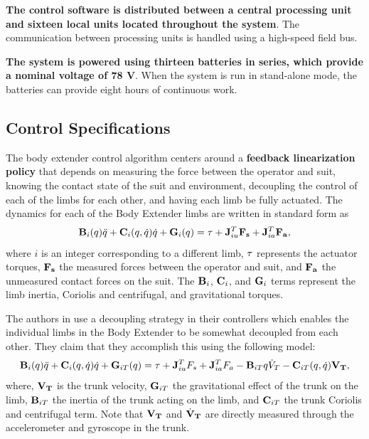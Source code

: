 {\bf The control software is distributed between a central processing unit and sixteen local units located throughout the system}.  The communication between processing units is handled using a high-speed field bus.
 
{\bf The system is powered using thirteen batteries in series, which provide a nominal voltage of 78 V}.  When the system is run in stand-alone mode, the batteries can provide eight hours of continuous work.
 
 
 \subsection{Control Specifications}
 
 The body extender control algorithm centers around a {\bf feedback linearization policy} that depends on measuring the force between the operator and suit, knowing the contact state of the suit and environment, decoupling the control of each of the limbs for each other, and having each limb be fully actuated.  The dynamics for each of the Body Extender limbs are written in standard form as  
\begin{equation}
{\bf B}_i(q) \ddot{q} + {\bf C}_i(q,\dot{q})\dot{q} + {\bf G}_i(q) = {\bf \tau} + {\bf J}^T_{iu}{\bf F_s} + {\bf J}^T_{ia}{\bf F_a},
\end{equation}
where $i$ is an integer corresponding to a different limb, ${\bf \tau}$ represents the actuator torques, ${\bf F_s}$ the measured forces between the operator and suit, and ${\bf F_a}$ the unmeasured contact forces on the suit.  The ${\bf B}_i$, ${\bf C}_i$, and ${\bf G}_i$ terms represent the limb inertia, Coriolis and centrifugal, and gravitational torques.  

The authors in \cite{} use a decoupling strategy in their controllers which enables the individual limbs in the Body Extender to be somewhat decoupled from each other.  They claim that they accomplish this using the following model:
\begin{equation}
{\bf B}_i(q) \ddot{q} + {\bf C}_i(q,\dot{q})\dot{q} + {\bf G}_{iT}(q) = {\bf \tau} + {\bf J}^T_{iu}F_s + {\bf J}^T_{ia}F_a - {\bf B}_{iT}{q}\dot{V}_T - {\bf C}_{iT}(q,\dot{q}){\bf V_T},
\end{equation}
where, ${\bf V_T}$ is the trunk velocity, ${\bf G}_{iT}$ the gravitational effect of the trunk on the limb, ${\bf B}_{iT}$ the inertia of the trunk acting on the limb, and ${\bf C}_{iT}$ the trunk Coriolis and centrifugal term.  Note that ${\bf V_T}$ and $\dot{{\bf V}}_{\bf T}$ are directly measured through the accelerometer and gyroscope in the trunk.


